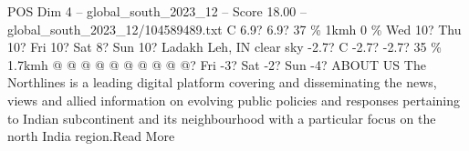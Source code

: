\begin{textsample}{POS Dim 4 – global\_south\_2023\_12 – Score 18.00 – global\_south\_2023\_12/104589489.txt}
C 6.9? 6.9? 37 \% 1kmh 0 \% Wed 10?
Thu 10?
Fri 10?
Sat 8?
Sun 10?
Ladakh Leh, IN clear sky -2.7?
C -2.7? -2.7? 35 \% 1.7kmh @ @ @ @ @ @ @ @ @ @?
Fri -3?
Sat -2?
Sun -4?
ABOUT US The Northlines is a leading digital platform covering and disseminating the news, views and allied information on evolving public policies and responses pertaining to Indian subcontinent and its neighbourhood with a particular focus on the north India region.Read More

\end{textsample}
